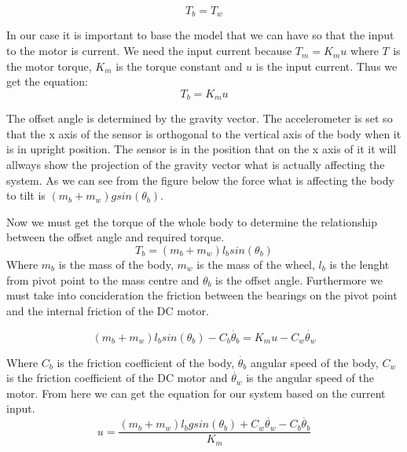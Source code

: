 \begin{equation}
 T_{b}=T_{w}
\end{equation}

In our case it is important to base the model that we can have so that the input to the motor is current.
We need the input current because $T_{m}=K_{m}u$ where $T_{}$ is the motor torque, $K_{m}$ is the torque constant and $u$ is the input current.
Thus we get the equation:
\begin{equation}
 T_{b}=K_{m}u
\end{equation}

The offset angle is determined by the gravity vector. 
The accelerometer is set so that the x axis of the sensor is orthogonal to the vertical axis of the body when it is in upright position.
The sensor is in the position that on the x axis of it it will allways show the projection of the gravity vector what is actually affecting the system.
As we can see from the figure below the force what is affecting the body to tilt is $(m_{b}+m_{w})gsin(\theta_{b})$.

Now we must get the torque of the whole body to determine the relationship between the offset angle and required torque.
\begin{equation}
 T_{b}=(m_{b}+m_{w})l_{b}sin(\theta_{b})
\end{equation}
Where $m_{b}$ is the mass of the body, $m_{w}$ is the mass of the wheel, $l_{b}$ is the lenght from pivot point to the mass centre and $\theta_{b}$ is the offset angle.
Furthermore we must take into concideration the friction between the bearings on the pivot point and the internal friction of the DC motor.

\begin{equation}
 (m_{b}+m_{w})l_{b}sin(\theta_{b})-C_{b}\dot{\theta_{b}}=K_{m}u-C_{w}\dot{\theta_{w}}
\end{equation}

Where $C_{b}$ is the friction coefficient of the body, $\dot{\theta_{b}}$ angular speed of the body, $C_{w}$ is the friction coefficient of the DC motor and $\dot{\theta_{w}}$ is the angular speed of the motor.
From here we can get the equation for our system based on the current input.
\begin{equation}
 u=\frac{(m_{b}+m_{w})l_{b}gsin(\theta_{b})+C_{w}\dot{\theta_{w}}-C_{b}\dot{\theta_{b}}}{K_{m}}
\end{equation}












